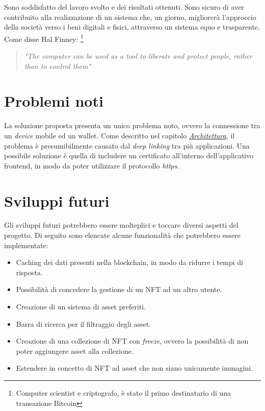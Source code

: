 \newpage

Sono soddisfatto del lavoro svolto e dei risultati ottenuti. Sono sicuro di aver contribuito alla realizzazione di un sistema che, un giorno, migliorerà l'approccio della società verso i beni digitali e fisici, attraverso un sistema equo e trasparente. Come disse Hal Finney: \footnote{Computer scientist e criptografo, è stato il primo destinatario di una transazione Bitcoin}

\begin{quote}
    \centering
\textit{"The computer can be used as a tool to liberate and protect people, rather than to control them"}
\end{quote}
    
\section{Problemi noti}

La soluzione proposta presenta un unico problema noto, ovvero la connessione tra un \textit{device} mobile ed un wallet. Come descritto nel capitolo \hyperref[sec:architettura]{\textit{Architettura}}, il problema è presumibilmente causato dal \textit{deep linking} tra più applicazioni. Una possibile soluzione è quella di includere un certificato all'interno dell'applicativo frontend, in modo da poter utilizzare il protocollo \textit{https}.

\section{Sviluppi futuri}

Gli sviluppi futuri potrebbero essere molteplici e toccare diversi aspetti del progetto. Di seguito sono elencate alcune funzionalità che potrebbero essere implementate:

\begin{itemize}
    \item Caching dei dati presenti nella blockchain, in modo da ridurre i tempi di risposta.
    \item Possibilità di concedere la gestione di un NFT ad un altro utente.
    \item Creazione di un sistema di asset preferiti.
    \item Barra di ricerca per il filtraggio degli asset.
    \item Creazione di una collezione di NFT con \textit{freeze}, ovvero la possibilità di non poter aggiungere asset alla collezione.
    \item Estendere in concetto di NFT ad asset che non siano unicamente immagini.
\end{itemize}


